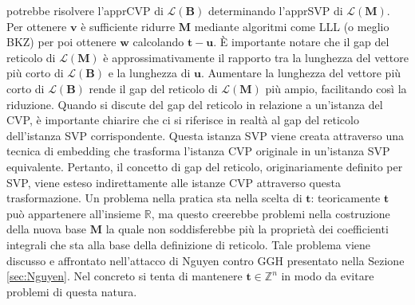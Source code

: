 potrebbe risolvere l'apprCVP di $\mathcal{L(\mathbf{B})}$ determinando l'apprSVP di $\mathcal{L}(\mathbf{M})$.
Per ottenere $\mathbf{v}$ è sufficiente ridurre $\mathbf{M}$
mediante algoritmi come LLL (o meglio BKZ) per poi ottenere $\mathbf{w}$ calcolando 
$\mathbf{t}-\mathbf{u}$.
È importante notare che il gap del reticolo di $\mathcal{L}(\mathbf{M})$ è approssimativamente il 
rapporto tra la lunghezza del vettore più corto di $\mathcal{L}(\mathbf{B})$ e la lunghezza 
di $\mathbf{u}$. Aumentare la lunghezza del vettore più corto di 
$\mathcal{L}(\mathbf{B})$ rende il gap del reticolo di $\mathcal{L}(\mathbf{M})$ più ampio, 
facilitando così la riduzione.
Quando si discute del gap del reticolo in relazione a un'istanza del CVP, è 
importante chiarire che ci si riferisce in realtà al gap del reticolo dell'istanza SVP corrispondente. 
Questa istanza SVP viene creata attraverso una tecnica di embedding che trasforma l'istanza 
CVP originale in un'istanza SVP equivalente. Pertanto, il concetto di gap del reticolo, 
originariamente definito per SVP, viene esteso indirettamente alle istanze CVP attraverso 
questa trasformazione.
Un problema nella pratica sta nella scelta di $\mathbf{t}$: teoricamente
$\mathbf{t}$ può appartenere all'insieme $\mathbb{R}$, ma questo creerebbe problemi nella
costruzione della nuova base $\mathbf{M}$ la quale non soddisferebbe più la proprietà dei 
coefficienti integrali che sta alla base della definizione di reticolo. Tale problema viene
discusso e affrontato nell'attacco di Nguyen contro GGH presentato nella Sezione \ref{sec:Nguyen}.
Nel concreto si tenta di mantenere $\mathbf{t} \in \mathbb{Z}^n$ in modo da evitare problemi
di questa natura.

